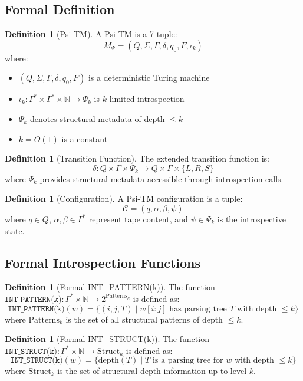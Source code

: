 \documentclass[11pt]{article}
\theoremstyle{definition}
\newtheorem{definition}[theorem]{Definition}
\begin{document}
\subsection{Formal Definition}

\begin{definition}[Psi-TM]
A Psi-TM is a 7-tuple:
$$M_\Psi = (Q, \Sigma, \Gamma, \delta, q_0, F, \iota_k)$$
where:
\begin{itemize}
\item $(Q, \Sigma, \Gamma, \delta, q_0, F)$ is a deterministic Turing machine
\item $\iota_k: \Gamma^* \times \Gamma^* \times \mathbb{N} \to \Psi_k$ is $k$-limited introspection
\item $\Psi_k$ denotes structural metadata of depth $\leq k$
\item $k = O(1)$ is a constant
\end{itemize}
\end{definition}

\begin{definition}[Transition Function]
The extended transition function is:
$$\delta: Q \times \Gamma \times \Psi_k \to Q \times \Gamma \times \{L, R, S\}$$
where $\Psi_k$ provides structural metadata accessible through introspection calls.
\end{definition}

\begin{definition}[Configuration]
A Psi-TM configuration is a tuple:
$$\mathcal{C} = (q, \alpha, \beta, \psi)$$
where $q \in Q$, $\alpha, \beta \in \Gamma^*$ represent tape content, and $\psi \in \Psi_k$ is the introspective state.
\end{definition}

\subsection{Formal Introspection Functions}

\begin{definition}[Formal INT\_PATTERN(k)]
The function $\texttt{INT\_PATTERN(k)}: \Gamma^* \times \mathbb{N} \to 2^{\text{Patterns}_k}$ is defined as:
$$\texttt{INT\_PATTERN(k)}(w) = \{(i,j,T) \mid w[i:j] \text{ has parsing tree } T \text{ with depth } \leq k\}$$
where $\text{Patterns}_k$ is the set of all structural patterns of depth $\leq k$.
\end{definition}

\begin{definition}[Formal INT\_STRUCT(k)]
The function $\texttt{INT\_STRUCT(k)}: \Gamma^* \times \mathbb{N} \to \text{Struct}_k$ is defined as:
$$\texttt{INT\_STRUCT(k)}(w) = \{\text{depth}(T) \mid T \text{ is a parsing tree for } w \text{ with depth } \leq k\}$$
where $\text{Struct}_k$ is the set of structural depth information up to level $k$.
\end{definition}
\end{document}
